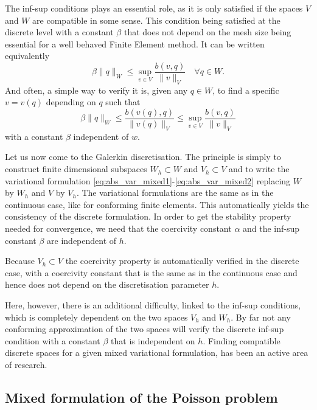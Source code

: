 The inf-sup conditions  plays an essential role, as it is only satisfied if the spaces $V$ and $W$ are compatible in some sense. This condition being satisfied at the discrete level  with a constant $\beta$ that does not depend on the mesh size being essential for a well behaved Finite Element method.  It can be written equivalently
\begin{equation}\label{inf-sup}
\beta \|q\|_W \leq \sup_{v\in V} \frac{b(v,q)}{\|v\|_V} \quad \forall q\in W.
\end{equation}
And often, a simple way to verify it is, given any  $q\in W$, to find a specific $v=v(q)$ depending on $q$ such that
$$\beta \|q\|_W \leq \frac{b(v(q),q)}{\|v(q)\|_V} \leq \sup_{v\in V} \frac{b(v,q)}{\|v\|_V}$$ with a constant $\beta$ independent of $w$.


Let us now come to the Galerkin discretisation. The principle is simply to construct finite dimensional subspaces $W_h \subset W$ and $V_h\subset V$ and to write the variational formulation \eqref{eq:abs_var_mixed1}-\eqref{eq:abs_var_mixed2} replacing $W$ by $W_h$ and $V$ by $V_h$. 
The variational formulations are the same as in the continuous case, like for conforming finite elements. This automatically yields the consistency of the discrete formulation.
In order to get the stability property needed for convergence, we need that the coercivity constant $\alpha$ and the inf-sup constant $\beta$ are independent of $h$.

Because $V_h\subset V$ the coercivity property is automatically verified in the discrete case, with a coercivity constant that is the same as in the continuous case and hence does not depend on the discretisation parameter $h$.

Here, however, there is an additional difficulty, linked to the inf-sup conditions, which is completely dependent on the two spaces $V_h$ and $W_h$. By far not any conforming approximation of the two spaces will verify the discrete inf-sup condition with a constant $\beta$ that is independent on $h$. Finding compatible discrete spaces for a given mixed variational formulation, has been an active area of research. 

 





\subsection{Mixed formulation of the Poisson problem}


